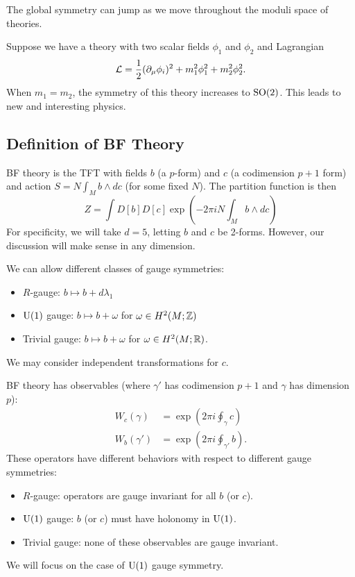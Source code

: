 The global symmetry can jump as we move throughout the moduli space of theories.

\begin{ex}
	Suppose we have a theory with two scalar fields $\phi_1$ and $\phi_2$ and Lagrangian
	\[
		\mathcal{L} = \frac{1}{2} (\partial_\mu \phi_i)^2 + m_1^2 \phi_1^2 + m_2^2 \phi_2^2.
	\]
	When $m_1 = m_2$, the symmetry of this theory increases to $\mathrm{SO}(2)$.
	This leads to new and interesting physics.
\end{ex}

\subsection{Definition of BF Theory}

BF theory is the TFT with fields $b$ (a $p$-form) and $c$ (a codimension $p+1$ form) and action $S = N \int_M b \wedge dc$ (for some fixed $N$).
The partition function is then
\[
	Z = \int D[b] D[c] \exp\left(-2\pi i N \int_M b \wedge dc \right)
\]
For specificity, we will take $d = 5$, letting $b$ and $c$ be 2-forms.
However, our discussion will make sense in any dimension.

We can allow different classes of gauge symmetries:
\begin{itemize}
	\item $R$-gauge: $b \mapsto b + d \lambda_1$
	\item $\mathrm{U}(1)$ gauge: $b \mapsto b + \omega$ for $\omega \in H^2(M; \mathbb{Z})$
	\item Trivial gauge: $b \mapsto b + \omega$ for $\omega \in H^2(M; \mathbb{R})$.
\end{itemize}
We may consider independent transformations for $c$.

BF theory has observables (where $\gamma'$ has codimension $p+1$ and $\gamma$ has dimension $p$):
\begin{align*}
	W_c(\gamma) &= \exp\left(2\pi i \oint_\gamma c\right) \\
	W_b(\gamma') &= \exp\left(2\pi i \oint_{\gamma'} b\right).
\end{align*}
These operators have different behaviors with respect to different gauge symmetries:
\begin{itemize}
	\item $R$-gauge: operators are gauge invariant for all $b$ (or $c$).
	\item $\mathrm{U}(1)$ gauge: $b$ (or $c$) must have holonomy in $\mathrm{U}(1)$.
	\item Trivial gauge: none of these observables are gauge invariant.
\end{itemize}
We will focus on the case of $\mathrm{U}(1)$ gauge symmetry.

